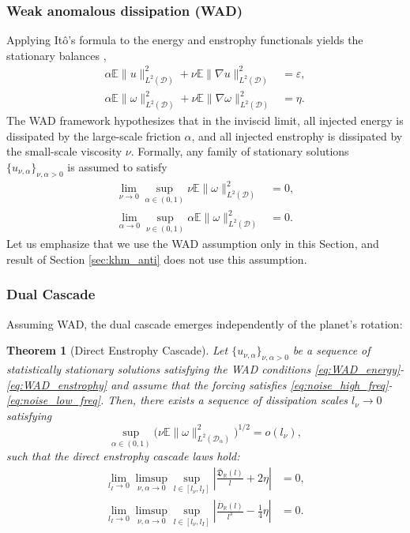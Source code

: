 \documentclass[11pt,a4paper]{article}
\numberwithin{equation}{section}
\newtheorem{theorem}{Theorem}%
\numberwithin{theorem}{section}
\numberwithin{remark}{section}
\numberwithin{definition}{section}
\begin{document}
\subsubsection{Weak anomalous dissipation  (WAD)}
Applying Itô's formula to the energy and enstrophy functionals yields the stationary balances \cite{YuriAmiraliGigliola},
\begin{align}
    \alpha \mathbb{E}\|u\|_{L^2(\mathcal{D})}^2 + \nu \mathbb{E}\|\nabla u\|_{L^2(\mathcal{D})}^2 &= \varepsilon, \label{eq:energy_balance} \\
    \alpha \mathbb{E}\|\omega\|_{L^2(\mathcal{D})}^2 + \nu \mathbb{E}\|\nabla \omega\|_{L^2(\mathcal{D})}^2 &= \eta. \label{eq:enstrophy_balance}
\end{align}
The WAD framework hypothesizes that in the inviscid limit, all injected energy is dissipated by the large-scale friction $\alpha$, and all injected enstrophy is dissipated by the small-scale viscosity $\nu$. Formally, any family of stationary solutions $\{u_{\nu,\alpha}\}_{\nu,\alpha > 0}$ is assumed to satisfy
\begin{align}
    \lim_{\nu \to 0} \sup_{\alpha \in (0,1)} \nu \mathbb{E}\| \omega\|_{L^2(\mathcal{D})}^2 &= 0, \label{eq:WAD_energy} \\
    \lim_{\alpha \to 0} \sup_{\nu \in (0,1)} \alpha \mathbb{E}\| \omega\|_{L^2(\mathcal{D})}^2 &= 0. \label{eq:WAD_enstrophy}
\end{align}
Let us emphasize that we use the WAD assumption only in this Section, and result of Section \ref{sec:khm_anti} does not use this assumption.

\subsubsection{Dual Cascade}

Assuming WAD, the dual cascade emerges independently of the planet's rotation:

\begin{theorem}[Direct Enstrophy Cascade]\label{thm:enstrophy_cascade} 
Let $\{u_{\nu,\alpha}\}_{\nu,\alpha > 0}$ be a sequence of statistically
stationary solutions satisfying the WAD conditions
\eqref{eq:WAD_energy}-\eqref{eq:WAD_enstrophy} and assume that the forcing satisfies \eqref{eq:noise_high_freq}-\eqref{eq:noise_low_freq}. Then, there exists a sequence
of dissipation scales $l_\nu \to 0$ satisfying
\begin{equation}\label{eq:dissipation_scale_WAD}
    \sup_{\alpha \in (0,1)} \big( \nu \mathbb{E}\|\omega\|_{L^2(\mathcal{D}_\alpha)}^2 \big)^{1/2} = o(l_\nu),
\end{equation}
such that the direct enstrophy cascade laws hold:
\begin{align}
    \lim_{l_I \to 0} \limsup_{\nu,\alpha \to 0} \sup_{l \in [l_\nu, l_I]} \left| \frac{\overline{\mathfrak{D}}_{\mathbb{R}}(l)}{l} + 2\eta \right| &= 0, \label{eq:cascade_mixed} \\
    \lim_{l_I \to 0} \limsup_{\nu,\alpha \to 0} \sup_{l \in [l_\nu, l_I]} \left| \frac{\overline{D}_{\mathbb{R}}(l)}{l^3} - \frac{1}{4}\eta \right| &= 0. \label{eq:cascade_velocity}
\end{align}
\end{theorem}
\end{document}
